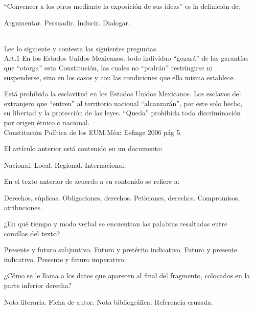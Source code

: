 \documentclass[12pt]{exam}
\begin{document}
\begin{questions}
    \question \enquote{Convencer a los otros mediante la exposición de sus ideas} es la definición de:
    \\[0.5em]
    \begin{oneparchoices}
    \choice Argumentar.
    \choice Persuadir.
    \choice Inducir.
    \choice Dialogar.
    \end{oneparchoices}
    \\[0.5em]

Lee lo siguiente y contesta las siguientes preguntas.
\\[0.5em]
Art.1 En los Estados Unidos Mexicanos, todo individuo \enquote{gozará} de las garantías que \enquote{otorga} esta Constitución, las cuales no \enquote{podrán} restringirse ni suspenderse, sino en los casos y con las condiciones que  ella misma establece.

Está prohibida la esclavitud en los Estados Unidos Mexicanos. Los esclavos del extranjero que \enquote{entren} al territorio nacional \enquote{alcanzarán}, por este solo hecho, su libertad  y la protección de las leyes.
\enquote{Queda} prohibida toda discriminación por origen étnico o nacional.
\\[0.25em]

                 Constitución Política de los EUM.Méx: Esfinge 2006 pág 5.

\question El artículo anterior está contenido en un documento:
\\[0.5em]
\begin{oneparchoices}
    \choice Nacional.
    \choice Local.
    \choice Regional.
    \choice Internacional.
\end{oneparchoices}

\question En el texto anterior de acuerdo a su contenido se refiere a:
\begin{choices}
    \choice Derechos, súplicas.
    \choice Obligaciones, derechos.
    \choice Peticiones, derechos.
    \choice Compromisos, atribuciones.
\end{choices}

\newpage

\question  ¿En qué tiempo y modo verbal se encuentran las palabras  resaltadas entre comillas del texto?
\begin{choices}
\choice Presente y futuro subjuntivo.
\choice Futuro y pretérito indicativo.
\choice Futuro y  presente indicativo.
\choice Presente y futuro imperativo.
\end{choices}

\question  ¿Cómo se le llama a los datos que aparecen al final del fragmento, colocados en la parte inferior derecha?
\begin{choices}
\choice Nota literaria.
\choice Ficha de autor.
\choice Nota bibliográfica.
\choice Referencia cruzada.
\end{choices}


\end{questions}
\end{document}
